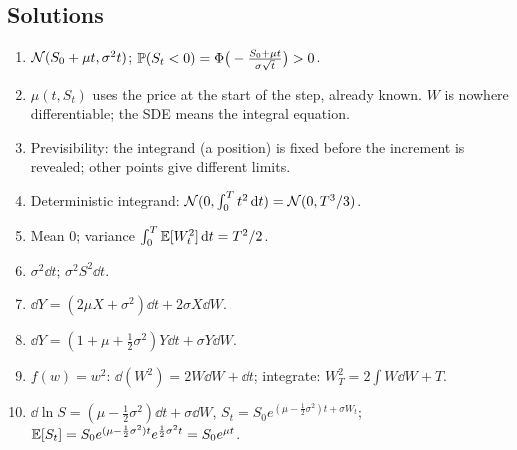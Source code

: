 \documentclass[10pt]{article}
\begin{document}
\subsection*{Solutions}
\begin{enumerate}[label=S\arabic*.]
\item $\mathcal{N}(S_0+\mu t,\sigma^2t)$; $\mathbb{P}(S_t<0)=\Phi\big(-\frac{S_0+\mu t}{\sigma\sqrt t}\big)>0$.
\item $\mu(t,S_t)$ uses the price at the start of the step, already known. $W$ is nowhere differentiable; the SDE means the integral equation.
\item Previsibility: the integrand (a position) is fixed before the increment is revealed; other points give different limits.
\item Deterministic integrand: $\mathcal{N}(0,\int_0^Tt^2\,\mathrm{d} t)=\mathcal{N}(0,T^3/3)$.
\item Mean 0; variance $\int_0^T\mathbb{E}[W_t^2]\,\mathrm{d} t=T^2/2$.
\item $\sigma^2\dd t$; $\sigma^2S^2\dd t$.
\item $\dd Y=(2\mu X+\sigma^2)\dd t+2\sigma X\dd W$.
\item $\dd Y=(1+\mu+\frac12\sigma^2)Y\dd t+\sigma Y\dd W$.
\item $f(w)=w^2$: $\dd(W^2)=2W\dd W+\dd t$; integrate: $W_T^2=2\int W\dd W+T$.
\item $\dd\ln S=(\mu-\frac12\sigma^2)\dd t+\sigma\dd W$, $S_t=S_0e^{(\mu-\frac12\sigma^2)t+\sigma W_t}$; $\mathbb{E}[S_t]=S_0e^{(\mu-\frac12\sigma^2)t}e^{\frac12\sigma^2t}=S_0e^{\mu t}$.
\end{enumerate}
\end{document}
